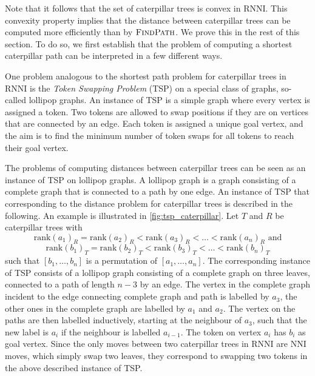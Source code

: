 \documentclass[11pt]{amsart}
\newcommand{\rnni}{\mathrm{RNNI}}
\newcommand{\findpath}{\textsc{FindPath}}
\newcommand{\rank}{\mathrm{rank}}
\newcommand{\nni}{\mathrm{NNI}}
\begin{document}
Note that it follows that the  set of caterpillar trees is convex in $\rnni$.
This convexity property implies that the distance between caterpillar trees can be computed more efficiently than by $\findpath$.
We prove this in the rest of this section.
To do so, we first establish that the problem of computing a shortest caterpillar path can be interpreted in a few different ways.

One problem analogous to the shortest path problem for caterpillar trees in $\rnni$ is the \emph{Token Swapping Problem} (TSP) \autocite{Kawahara2017-ey} on a special class of graphs, so-called lollipop graphs.
An instance of TSP is a simple graph where every vertex is assigned a token.
Two tokens are allowed to swap positions if they are on vertices that are connected by an edge.
Each token is assigned a unique goal vertex, and the aim is to find the minimum number of token swaps for all tokens to reach their goal vertex.

The problems of computing distances between caterpillar trees can be seen as an instance of TSP on lollipop graphs.
A lollipop graph is a graph consisting of a complete graph that is connected to a path by one edge.
An instance of TSP that corresponding to the distance problem for caterpillar trees is described in the following.
An example is illustrated in \autoref{fig:tsp_caterpillar}.
Let $T$ and $R$ be caterpillar trees with
\[\rank(a_1)_R = \rank(a_2)_R < \rank(a_3)_R < \ldots < \rank(a_n)_R \text{ and}\]
\[\rank(b_1)_T = \rank(b_2)_T < \rank(b_3)_T < \ldots < \rank(b_n)_T\]
such that $[b_1, \ldots, b_n]$ is a permutation of $[a_1, \ldots, a_n]$.
The corresponding instance of TSP consists of a lollipop graph consisting of a complete graph on three leaves, connected to a path of length $n-3$ by an edge.
The vertex in the complete graph incident to the edge connecting complete graph and path is labelled by $a_3$, the other ones in the complete graph are labelled by $a_1$ and $a_2$.
The vertex on the paths are then labelled inductively, starting at the neighbour of $a_3$, such that the new label is $a_i$ if the neighbour is labelled $a_{i-1}$.
The token on vertex $a_i$ has $b_i$ as goal vertex.
Since the only moves between two caterpillar trees in $\rnni$ are $\nni$ moves, which simply swap two leaves, they correspond to swapping two tokens in the above described instance of TSP.
\end{document}
